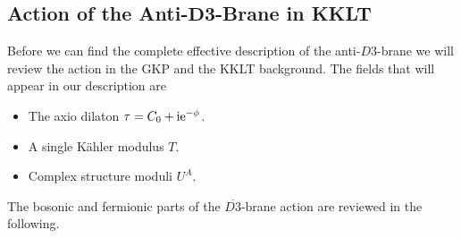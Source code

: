 \documentclass[a4paper,12pt]{report}
\def\rmi{{\rm i}}
\def\rme{{\rm e}}
\begin{document}
\subsection[Action of the Anti-$D3$-Brane in KKLT]{Action of the Anti-$\mathbf{D3}$-Brane in KKLT}
\label{sec:D3barKKLT}
Before we can find the complete effective description of the anti-$D3$-brane we will review the action in the GKP \cite{Giddings:2001yu} and the KKLT \cite{Kachru:2003aw,Kachru:2003sx} background. The fields that will appear in our description are 
\begin{itemize}
\item The axio dilaton $\tau = C_0 + \rmi \rme^{-\phi}$.
\item A single Kähler modulus $T$.
\item Complex structure moduli $U^A$.
\end{itemize}
The bosonic and fermionic parts of the $\overline{D3}$-brane action are reviewed in the following.
\end{document}
